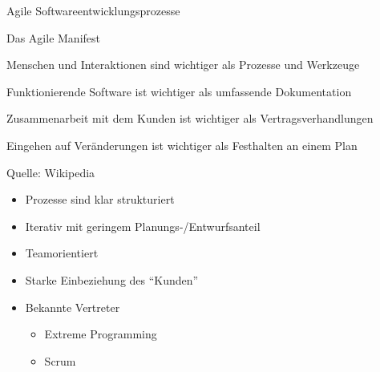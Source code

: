 \begin{frame}{Agile Softwareentwicklungsprozesse}
	\begin{block}{Das Agile Manifest}
		\begin{itemize}
		\end{itemize}
		\tiny{Quelle: Wikipedia}
	\end{block}
	
	\begin{itemize}
		\item Prozesse sind klar strukturiert
		\item Iterativ mit geringem Planungs-/Entwurfsanteil
		\item Teamorientiert
		\item Starke Einbeziehung des \enquote{Kunden}
	\end{itemize}
	
	\begin{itemize}
		\item Bekannte Vertreter
		\begin{itemize}
			\item Extreme Programming
			\item Scrum
		\end{itemize}
	\end{itemize}
\end{frame}

